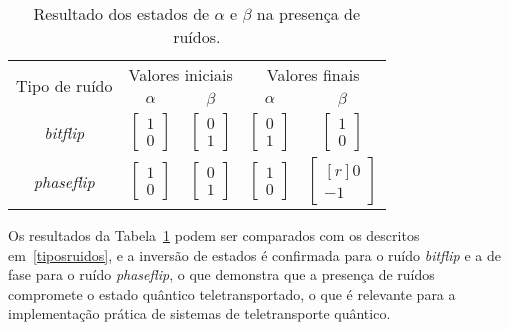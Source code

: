 \begin{table}[ht!]
  \centering
  \caption{Resultado dos estados de $\alpha$ e $\beta$ na presença de ruídos.}\label{tab:resultadoruidos}
  \begin{tabular}{ccccc}
    \toprule
    \multirow{2}{*}{Tipo de ruído} & \multicolumn{2}{c}{Valores iniciais} & \multicolumn{2}{c}{Valores finais}                                     \\
    \cmidrule{2-5}
                                   & $\alpha$ & $\beta$ & $\alpha$ & $\beta$ \\
    \midrule
    \textit{bitflip}   & $\begin{bmatrix} 1 \\ 0 \end{bmatrix}$ & $\begin{bmatrix} 0 \\ 1 \end{bmatrix}$ & $\begin{bmatrix} 0 \\ 1 \end{bmatrix}$ & $\begin{bmatrix} 1 \\ 0 \end{bmatrix}$ \\
    \textit{phaseflip} & $\begin{bmatrix} 1 \\ 0 \end{bmatrix}$ & $\begin{bmatrix} 0 \\ 1 \end{bmatrix}$ & $\begin{bmatrix} 1 \\ 0 \end{bmatrix}$ & $\begin{bmatrix*}[r] 0 \\ -1 \end{bmatrix*}$ \\
    \bottomrule
  \end{tabular}
\end{table}

Os resultados da Tabela~\ref{tab:resultadoruidos} podem ser comparados com os descritos em~\ref{tiposruidos}, e a inversão de estados é confirmada para o ruído \textit{bitflip} e a de fase para o ruído \textit{phaseflip}, o que demonstra que a presença de ruídos compromete o estado quântico teletransportado, o que é relevante para a implementação prática de sistemas de teletransporte quântico.

